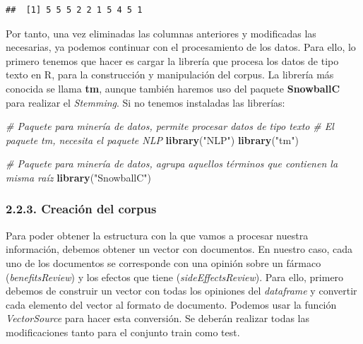\documentclass[spanish,]{article}
\newenvironment{Shaded}{\begin{snugshade}}{\end{snugshade}}
\newcommand{\KeywordTok}[1]{\textcolor[rgb]{0.13,0.29,0.53}{\textbf{#1}}}
\newcommand{\StringTok}[1]{\textcolor[rgb]{0.31,0.60,0.02}{#1}}
\newcommand{\CommentTok}[1]{\textcolor[rgb]{0.56,0.35,0.01}{\textit{#1}}}
\newcommand{\NormalTok}[1]{#1}
\begin{document}
\begin{verbatim}
##  [1] 5 5 5 2 2 1 5 4 5 1
\end{verbatim}

Por tanto, una vez eliminadas las columnas anteriores y modificadas las
necesarias, ya podemos continuar con el procesamiento de los datos. Para
ello, lo primero tenemos que hacer es cargar la librería que procesa los
datos de tipo texto en R, para la construcción y manipulación del
corpus. La librería más conocida se llama \textbf{tm}, aunque también
haremos uso del paquete \textbf{SnowballC} para realizar el
\emph{Stemming}. Si no tenemos instaladas las librerías:

\begin{Shaded}
\begin{Highlighting}[]
\CommentTok{# Paquete para minería de datos, permite procesar datos de tipo texto}
\CommentTok{# El paquete tm, necesita el paquete NLP}
\KeywordTok{library}\NormalTok{(}\StringTok{"NLP"}\NormalTok{)}
\KeywordTok{library}\NormalTok{(}\StringTok{"tm"}\NormalTok{)}

\CommentTok{# Paquete para minería de datos, agrupa aquellos términos que contienen la misma raíz}
\KeywordTok{library}\NormalTok{(}\StringTok{"SnowballC"}\NormalTok{)}
\end{Highlighting}
\end{Shaded}

\subsubsection{2.2.3. Creación del corpus}\label{creacion-del-corpus}

Para poder obtener la estructura con la que vamos a procesar nuestra
información, debemos obtener un vector con documentos. En nuestro caso,
cada uno de los documentos se corresponde con una opinión sobre un
fármaco (\emph{benefitsReview}) y los efectos que tiene
(\emph{sideEffectsReview}). Para ello, primero debemos de construir un
vector con todas los opiniones del \emph{dataframe} y convertir cada
elemento del vector al formato de documento. Podemos usar la función
\emph{VectorSource} para hacer esta conversión. Se deberán realizar
todas las modificaciones tanto para el conjunto train como test.
\end{document}
